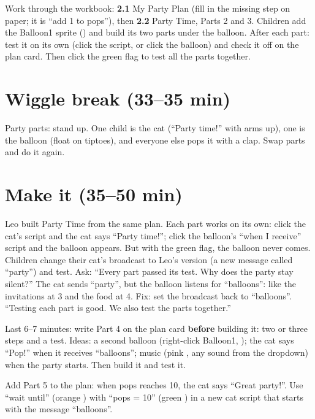 Work through the workbook: \textbf{2.1} My Party Plan (fill in the missing step on paper; it is \enquote{add 1 to pops}), then \textbf{2.2} Party Time, Parts 2 and 3. Children add the Balloon1 sprite () and build its two parts under the balloon. After each part: test it on its own (click the script, or click the balloon) and check it off on the plan card. Then click the green flag to test all the parts together.

\section{Wiggle break (33--35 min)}
Party parts: stand up. One child is the cat (\enquote{Party time!} with arms up), one is the balloon (float on tiptoes), and everyone else pops it with a clap. Swap parts and do it again.

\section{Make it (35--50 min)}
\begin{bughunt}
Leo built Party Time from the same plan. Each part works on its own: click the cat's script and the cat says \enquote{Party time!}; click the balloon's \enquote{when I receive} script and the balloon appears. But with the green flag, the balloon never comes. Children change their cat's broadcast to Leo's version (a new message called \enquote{party}) and test. Ask: \enquote{Every part passed its test. Why does the party stay silent?} The cat sends \enquote{party}, but the balloon listens for \enquote{balloons}: like the invitations at 3 and the food at 4. Fix: set the broadcast back to \enquote{balloons}. \enquote{Testing each part is good. We also test the parts together.}
\end{bughunt}

\begin{freebuild}
Last 6--7 minutes: write Part 4 on the plan card \textbf{before} building it: two or three steps and a test. Ideas: a second balloon (right-click Balloon1, ); the cat says \enquote{Pop!} when it receives \enquote{balloons}; music (pink , any sound from the dropdown) when the party starts. Then build it and test it.
\end{freebuild}

\begin{stretchchallenge}
Add Part 5 to the plan: when pops reaches 10, the cat says \enquote{Great party!}. Use \enquote{wait until} (orange ) with \enquote{pops = 10} (green ) in a new cat script that starts with the message \enquote{balloons}.
\end{stretchchallenge}

